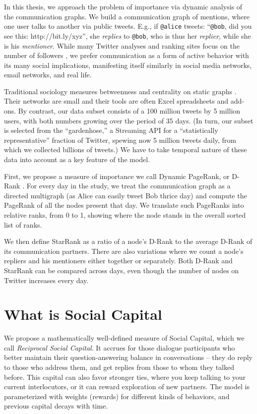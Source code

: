 \documentclass[10pt,oneside]{memoir}
\begin{document}
\begin{Spacing}{2}
In this thesis, we approach the problem of importance via dynamic analysis of the communication graphs. We build a communication graph of mentions, where one user talks to another via public tweets. E.g., if \texttt{@alice} tweets: ``\texttt{@bob}, did you see this: http://bit.ly/xyz'', she {\itshape replies} to \texttt{@bob}, who is thus her {\itshape replier}, while she is his {\itshape mentioner}. While many Twitter analyses and ranking sites focus on the number of followers \cite{DBLP:conf/kdd/JavaSFT07}, we prefer communication as a form of active behavior with its many social implications, manifesting itself similarly in social media networks, email networks, and real life.


Traditional sociology measures betweenness and centrality on static graphs \cite{bonacich1987power}. Their networks are small and their tools are often Excel spreadsheets and add-ons. By contrast, our data subset consists of a 100 million tweets by 5 million users, with both numbers growing over the period of 35 days. (In turn, our subset is selected from the ``gardenhose,'' a Streaming API for a ``statistically representative'' fraction of Twitter, spewing now 5 million tweets daily, from which we collected billions of tweets.) We have to take temporal nature of these data into account as a key feature of the model.


First, we propose a measure of importance we call Dynamic PageRank, or D-Rank \cite{Khrabrov:2010:Dynamic}. For every day in the study, we treat the communication graph as a directed multigraph (as Alice can easily tweet Bob thrice day) and compute the PageRank of all the nodes present that day. We translate such PageRanks into relative ranks, from 0 to 1, showing where the node stands in the overall sorted list of ranks.


We then define StarRank as a ratio of a node's D-Rank to the average D-Rank of its communication partners. There are also variations where we count a node's repliers and his mentioners either together or separately. Both D-Rank and StarRank can be compared across days, even though the number of nodes on Twitter increases every day.


\pagebreak \section{What is Social Capital}
\label{whatissocialcapital}

We propose a mathematically well-defined measure of Social Capital, which we call {\itshape Reciprocal Social Capital}.  It accrues for those dialogue participants who better maintain their question-answering balance in conversations -- they do reply to those who address them, and get replies from those to whom they talked before. This capital can also favor stronger ties, where you keep talking to your current interlocutors, or it can reward exploration of new partners. The model is parameterized with weights (rewards) for different kinds of behaviors, and previous capital decays with time.



\end{Spacing}
\end{document}
